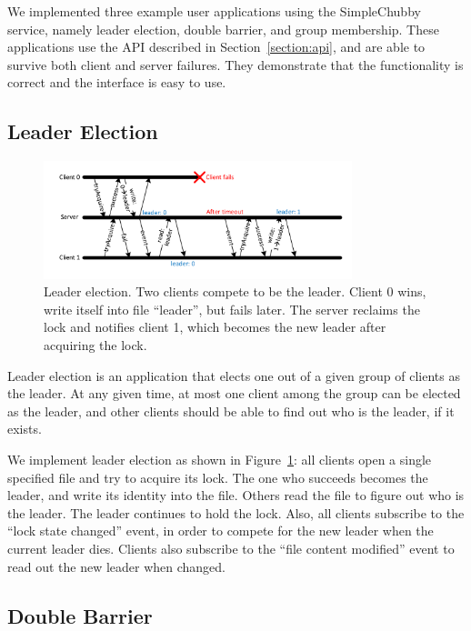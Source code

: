 We implemented three example user applications using the SimpleChubby service,
namely leader election, double barrier, and group membership.
These applications use the API described in Section~\ref{section:api},
and are able to survive both client and server failures. They demonstrate
that the functionality is correct and the interface is easy to use.

\subsection{Leader Election}

\begin{figure}
\centering
\includegraphics[width=0.8\textwidth]{leader_elect.pdf}
\caption{Leader election. Two clients compete to be the leader. Client 0 wins,
write itself into file ``leader'', but fails later. The server reclaims the
lock and notifies client 1, which becomes the new leader after acquiring the lock.}
\label{fig:leader_elect}
\end{figure}

Leader election is an application that elects one out of a given group
of clients as the leader. At any given time, at most one client among the
group can be elected as the leader, and other clients should be able to
find out who is the leader, if it exists.

We implement leader election as shown in Figure~\ref{fig:leader_elect}:
all clients open a single
specified file and try to acquire its lock. The one who succeeds becomes
the leader, and write its identity into the file. Others read the file
to figure out who is the leader. The leader continues to hold the lock.
Also, all clients subscribe to the ``lock state changed'' event, in order
to compete for the new leader when the current leader dies. Clients also
subscribe to the ``file content modified'' event to read out the new
leader when changed.

\subsection{Double Barrier}

